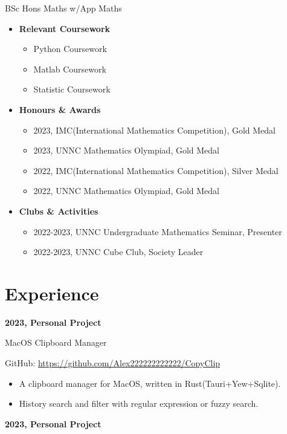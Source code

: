 \documentclass{article}
\begin{document}
    \noindent BSc Hons Maths w/App Maths
    \begin{itemize}
        \item \textbf{Relevant Coursework}
        \begin{itemize}
            \item Python Coursework
            \item Matlab Coursework
            \item Statistic Coursework
        \end{itemize}
        \item \textbf{Honours \& Awards}
        \begin{itemize}
            \item 2023, IMC(International Mathematics Competition), Gold Medal
            \item 2023, UNNC Mathematics Olympiad, Gold Medal
            \item 2022, IMC(International Mathematics Competition), Silver Medal
            \item 2022, UNNC Mathematics Olympiad, Gold Medal
        \end{itemize}
        \item \textbf{Clubs \& Activities}
        \begin{itemize}
            \item 2022-2023, UNNC Undergraduate Mathematics Seminar, Presenter
            \item 2022-2023, UNNC Cube Club, Society Leader
        \end{itemize}
    \end{itemize}

\section*{Experience}
    \noindent\textbf{2023, Personal Project}

    \noindent MacOS Clipboard Manager

    \noindent GitHub: \href{https://github.com/Alex222222222222/CopyClip}{https://github.com/Alex222222222222/CopyClip}
    \begin{itemize}
        \item A clipboard manager for MacOS, written in Rust(Tauri+Yew+Sqlite).
        \item History search and filter with regular expression or fuzzy search.
    \end{itemize}

    \noindent\textbf{2023, Personal Project}
    
\end{document}
